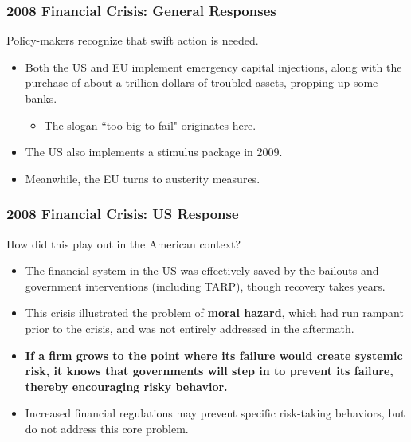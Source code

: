 \documentclass{beamer}
\begin{document}
\begin{frame} 
	\frametitle{\LARGE{2008 Financial Crisis: General Responses}}
	Policy-makers recognize that swift action is needed.
	\begin{itemize}
		\item Both the US and EU implement emergency capital injections, along with the purchase of about a trillion dollars of troubled assets, propping up some banks. \pause
		\begin{itemize}
			\item The slogan ``too big to fail" originates here. \pause
		\end{itemize}
		\item The US also implements a stimulus package in 2009. \pause
		\item Meanwhile, the EU turns to austerity measures.
	\end{itemize}
\end{frame}

\begin{frame} 
	\frametitle{\LARGE{2008 Financial Crisis: US Response}}
	How did this play out in the American context? \pause
	\begin{itemize}
		\item The financial system in the US was effectively saved by the bailouts and government interventions (including TARP), though recovery takes years. \pause
		
		\item This crisis illustrated the problem of \textbf{moral hazard}, which had run rampant prior to the crisis, and was not entirely addressed in the aftermath. \pause
		
		\item \textbf{If a firm grows to the point where its failure would create systemic risk, it knows that governments will step in to prevent its failure, thereby encouraging risky behavior.} \pause
		
		\item Increased financial regulations may prevent specific risk-taking behaviors, but do not address this core problem.
		
		
	\end{itemize}
\end{frame}
\end{document}

